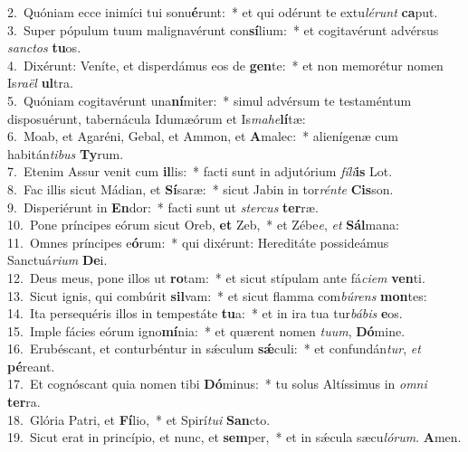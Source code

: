 {2.~}Quóniam ecce inimíci tui sonu\textbf{é}runt:~* et qui odérunt te extu\textit{lé}\textit{runt} \textbf{ca}put.\\
{3.~}Super pópulum tuum malignavérunt con\textbf{sí}lium:~* et cogitavérunt advérsus \textit{san}\textit{ctos} \textbf{tu}os.\\
{4.~}Dixérunt: Veníte, et disperdámus eos de \textbf{gen}te:~* et non memorétur nomen Is\textit{ra}\textit{ël} \textbf{ul}tra.\\
{5.~}Quóniam cogitavérunt una\textbf{ní}miter:~* simul advérsum te testaméntum disposuérunt, tabernácula Idumæórum et Is\textit{ma}\textit{he}\textbf{lí}tæ:\\
{6.~}Moab, et Agaréni, Gebal, et Ammon, et \textbf{A}malec:~* alienígenæ cum habitán\textit{ti}\textit{bus} \textbf{Ty}rum.\\
{7.~}Etenim Assur venit cum \textbf{il}lis:~* facti sunt in adjutórium \textit{fí}\textit{li}\textbf{is} Lot.\\
{8.~}Fac illis sicut Mádian, et \textbf{Sí}saræ:~* sicut Jabin in tor\textit{rén}\textit{te} \textbf{Cis}son.\\
{9.~}Disperiérunt in \textbf{En}dor:~* facti sunt ut \textit{ster}\textit{cus} \textbf{ter}ræ.\\
{10.~}Pone príncipes eórum sicut Oreb, \textbf{et} Zeb,~* et Zébe\textit{e}, \textit{et} \textbf{Sál}mana:\\
{11.~}Omnes príncipes e\textbf{ó}rum:~* qui dixérunt: Hereditáte possideámus Sanctuá\textit{ri}\textit{um} \textbf{De}i.\\
{12.~}Deus meus, pone illos ut \textbf{ro}tam:~* et sicut stípulam ante fá\textit{ci}\textit{em} \textbf{ven}ti.\\
{13.~}Sicut ignis, qui combúrit \textbf{sil}vam:~* et sicut flamma com\textit{bú}\textit{rens} \textbf{mon}tes:\\
{14.~}Ita persequéris illos in tempestáte \textbf{tu}a:~* et in ira tua tur\textit{bá}\textit{bis} \textbf{e}os.\\
{15.~}Imple fácies eórum igno\textbf{mí}nia:~* et quærent nomen \textit{tu}\textit{um}, \textbf{Dó}mine.\\
{16.~}Erubéscant, et conturbéntur in sǽculum \textbf{sǽ}culi:~* et confundán\textit{tur}, \textit{et} \textbf{pé}reant.\\
{17.~}Et cognóscant quia nomen tibi \textbf{Dó}minus:~* tu solus Altíssimus in \textit{om}\textit{ni} \textbf{ter}ra.\\
{18.~}Glória Patri, et \textbf{Fí}lio,~* et Spirí\textit{tu}\textit{i} \textbf{San}cto.\\
{19.~}Sicut erat in princípio, et nunc, et \textbf{sem}per,~* et in sǽcula sæcu\textit{ló}\textit{rum}. \textbf{A}men.\\
